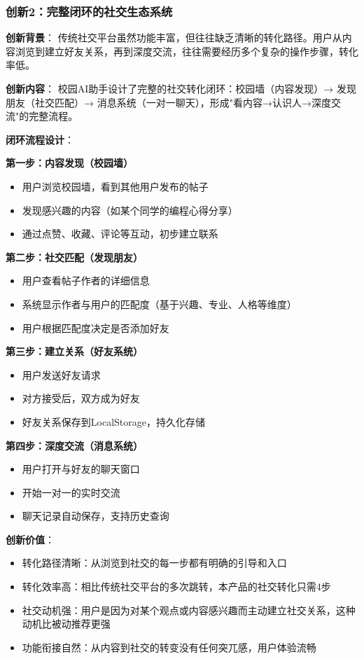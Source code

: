 \documentclass[12pt,a4paper]{article}
\begin{document}
\subsubsection{创新2：完整闭环的社交生态系统}

\textbf{创新背景}：
传统社交平台虽然功能丰富，但往往缺乏清晰的转化路径。用户从内容浏览到建立好友关系，再到深度交流，往往需要经历多个复杂的操作步骤，转化率低。

\textbf{创新内容}：
校园AI助手设计了完整的社交转化闭环：校园墙（内容发现）→ 发现朋友（社交匹配）→ 消息系统（一对一聊天），形成"看内容→认识人→深度交流"的完整流程。

\textbf{闭环流程设计}：

\textbf{第一步：内容发现（校园墙）}
\begin{itemize}
    \item 用户浏览校园墙，看到其他用户发布的帖子
    \item 发现感兴趣的内容（如某个同学的编程心得分享）
    \item 通过点赞、收藏、评论等互动，初步建立联系
\end{itemize}

\textbf{第二步：社交匹配（发现朋友）}
\begin{itemize}
    \item 用户查看帖子作者的详细信息
    \item 系统显示作者与用户的匹配度（基于兴趣、专业、人格等维度）
    \item 用户根据匹配度决定是否添加好友
\end{itemize}

\textbf{第三步：建立关系（好友系统）}
\begin{itemize}
    \item 用户发送好友请求
    \item 对方接受后，双方成为好友
    \item 好友关系保存到LocalStorage，持久化存储
\end{itemize}

\textbf{第四步：深度交流（消息系统）}
\begin{itemize}
    \item 用户打开与好友的聊天窗口
    \item 开始一对一的实时交流
    \item 聊天记录自动保存，支持历史查询
\end{itemize}

\textbf{创新价值}：
\begin{itemize}
    \item 转化路径清晰：从浏览到社交的每一步都有明确的引导和入口
    \item 转化效率高：相比传统社交平台的多次跳转，本产品的社交转化只需4步
    \item 社交动机强：用户是因为对某个观点或内容感兴趣而主动建立社交关系，这种动机比被动推荐更强
    \item 功能衔接自然：从内容到社交的转变没有任何突兀感，用户体验流畅
\end{itemize}
\end{document}
